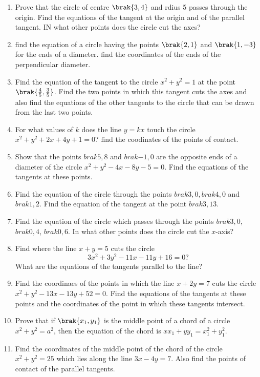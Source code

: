 \begin{enumerate}[1.]
\item Prove that the circle of centre $\brak{3,4}$ and rdius 5 passes
through the origin.  Find the equations of the tangent at the origin 
and of the parallel tangent.  IN what other points does the circle
cut the axes?
\item find the equation of a circle having the points $\brak{2,1}$
and $\brak{1,-3}$ for the ends of a diameter.  find
the coordinates of the ends of the perpendicular diameter.
\item Find the equation of the tangent to the circle $x^2+y^2=1$
at the point $\brak{\frac{4}{5},\frac{3}{5}}$.  Find the two points
in which this tangent cuts the axes and also find the equations of the other
tangents to the circle that can be drawn from the last two points.
\item For what values of $k$ does the line $y=kx$ touch the circle
$x^2+y^2+2x+4y+1=0$?  find the coodinates of the points of contact.
\item Show that the points $brak{5,8}$ and $brak{-1,0}$ are the opposite
ends of a diameter of the circle $x^2+y^2-4x-8y-5=0$.  Find the equations
of the tangents at these points.
\item Find the equation of the circle through the points $brak{3,0},brak{4,0}$
and $brak{1,2}$.  Find the equation of the tangent at the point $brak{3,13}$.
\item Find the equation of the circle which passes through the points
$brak{3,0}$, $brak{0,4}$, $brak{0,6}$.  In what other points does the circle
cut the $x$-axis?
\item Find where the line $x+y=5$ cuts the circle 
\begin{equation}
3x^2+3y^2-11x-11y+16=0?
\end{equation}
What are the equations of the tangents parallel to the line?
\item Find the coordinaes of the points in which the line $x+2y=7$ cuts the
circle $x^2+y^2-13x-13y+52=0$.  Find the equations of the tangents at these
points and the coordinates of the point in which these tangents intersect.
\item Prove that if $\brak{x_1,y_1}$ is the middle point of a chord of a circle
$x^2+y^2=a^2$, then the equation of the chord is $xx_1+yy_1 = x_1^2+y_1^2$.  
\item Find the coordinates of the middle point of the chord of the circle
$x^2+y^2=25$ which lies along the line $3x-4y=7$.  Also find the 
points of contact of the parallel tangents.

\end{enumerate}
